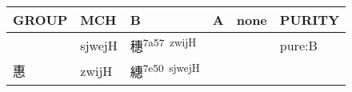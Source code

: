 \documentclass[14pt,a4paper]{scrartcl}
\begin{document}
\begin{longtable}[c]{@{}llllll@{}}
\toprule
\begin{minipage}[b]{0.14\columnwidth}\raggedright\strut
GROUP
\strut\end{minipage} &
\begin{minipage}[b]{0.14\columnwidth}\raggedright\strut
MCH
\strut\end{minipage} &
\begin{minipage}[b]{0.14\columnwidth}\raggedright\strut
B
\strut\end{minipage} &
\begin{minipage}[b]{0.14\columnwidth}\raggedright\strut
A
\strut\end{minipage} &
\begin{minipage}[b]{0.14\columnwidth}\raggedright\strut
none
\strut\end{minipage} &
\begin{minipage}[b]{0.14\columnwidth}\raggedright\strut
PURITY
\strut\end{minipage}\tabularnewline
\midrule
\endhead
\begin{minipage}[t]{0.14\columnwidth}\raggedright\strut
𥝩
\strut\end{minipage} &
\begin{minipage}[t]{0.14\columnwidth}\raggedright\strut
sjwejH
\strut\end{minipage} &
\begin{minipage}[t]{0.14\columnwidth}\raggedright\strut
穗\textsuperscript{7a57~zwijH}
\strut\end{minipage} &
\begin{minipage}[t]{0.14\columnwidth}\raggedright\strut
\strut\end{minipage} &
\begin{minipage}[t]{0.14\columnwidth}\raggedright\strut
\strut\end{minipage} &
\begin{minipage}[t]{0.14\columnwidth}\raggedright\strut
pure:B
\strut\end{minipage}\tabularnewline
\begin{minipage}[t]{0.14\columnwidth}\raggedright\strut
惠
\strut\end{minipage} &
\begin{minipage}[t]{0.14\columnwidth}\raggedright\strut
zwijH
\strut\end{minipage} &
\begin{minipage}[t]{0.14\columnwidth}\raggedright\strut
繐\textsuperscript{7e50~sjwejH}
\strut\end{minipage} &

\end{longtable}
\end{document}
